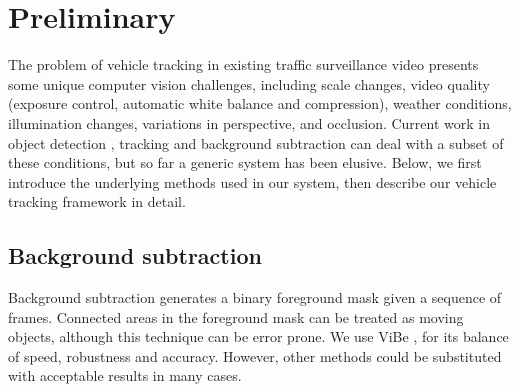\section{Preliminary}
\label{sec:tracker-preliminary}

The problem of vehicle tracking in existing traffic surveillance video presents some unique computer vision challenges, including scale changes, video quality (exposure control, automatic white balance and compression), weather conditions, illumination changes, variations in perspective, and occlusion.
Current work in object detection 
\cite{viola2001rapid,dalal2005histograms,felzenszwalb2010cascade,girshick2014rich}, 
tracking \cite{henriques2015high,hare2011struck,vojir2014robust}
and background subtraction \cite{barnich2011vibe,zivkovic2006efficient}
can deal with a subset of these conditions, but so far a generic system has been elusive. Below, we first introduce the underlying methods used in our system, then describe our vehicle tracking framework in detail. 


\subsection{Background subtraction}
Background subtraction generates a binary foreground mask given a sequence of frames. Connected areas in the foreground mask can be treated as moving objects, although this technique can be error prone. 
We use ViBe \cite{barnich2011vibe}, for its balance of speed, robustness and accuracy. However, other methods 
could be substituted with acceptable results in many cases.

